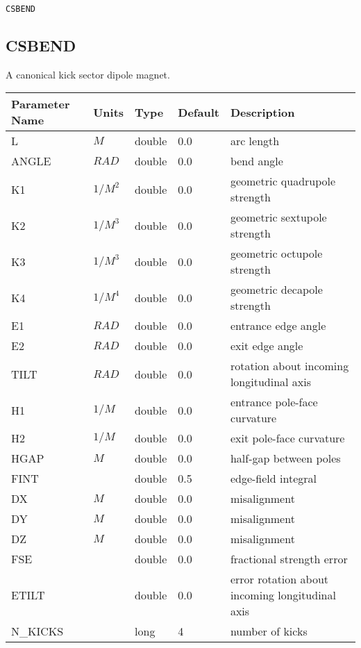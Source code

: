 \begin{latexonly}
\newpage
\begin{center}{\Large\verb|CSBEND|}\end{center}
\end{latexonly}\subsection{CSBEND}
A canonical kick sector dipole magnet.
\\
\begin{tabular}{|l|l|l|l|p{\descwidth}|} \hline
Parameter Name & Units & Type & Default & Description \\ \hline 
L & $M$ & double &  0.0 & arc length  \\ \hline 
ANGLE & $RAD$ & double &  0.0 & bend angle  \\ \hline 
K1 & $1/M^{2}$ & double &  0.0 & geometric quadrupole strength  \\ \hline 
K2 & $1/M^{3}$ & double &  0.0 & geometric sextupole strength  \\ \hline 
K3 & $1/M^{3}$ & double &  0.0 & geometric octupole strength  \\ \hline 
K4 & $1/M^{4}$ & double &  0.0 & geometric decapole strength  \\ \hline 
E1 & $RAD$ & double &  0.0 & entrance edge angle  \\ \hline 
E2 & $RAD$ & double &  0.0 & exit edge angle  \\ \hline 
TILT & $RAD$ & double &  0.0 & rotation about incoming longitudinal axis  \\ \hline 
H1 & $1/M$ & double &  0.0 & entrance pole-face curvature  \\ \hline 
H2 & $1/M$ & double &  0.0 & exit pole-face curvature  \\ \hline 
HGAP & $M$ & double &  0.0 & half-gap between poles  \\ \hline 
FINT &  & double &   0.5 & edge-field integral  \\ \hline 
DX & $M$ & double &  0.0 & misalignment  \\ \hline 
DY & $M$ & double &  0.0 & misalignment  \\ \hline 
DZ & $M$ & double &  0.0 & misalignment  \\ \hline 
FSE &  & double &  0.0 & fractional strength error  \\ \hline 
ETILT &  & double &  0.0 & error rotation about incoming longitudinal axis  \\ \hline 
N\_KICKS &  & long &   4               & number of kicks  \\ \hline 

\end{tabular}
